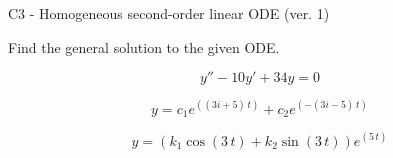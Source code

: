 \begin{exercise}
  \begin{exerciseTitle}C3 - Homogeneous second-order linear ODE (ver. 1)\end{exerciseTitle}
  \begin{exerciseStatement}
    
Find the general solution to the given ODE.

    
\[y''-10y'+34y = 0\]

  \end{exerciseStatement}
  \begin{exerciseAnswer}
    
\[y= c_{1} e^{\left(\left(3 i + 5\right) \, t\right)} + c_{2} e^{\left(-\left(3 i - 5\right) \, t\right)}\]

    
\[y= {\left(k_{1} \cos\left(3 \, t\right) + k_{2} \sin\left(3 \, t\right)\right)} e^{\left(5 \, t\right)}\]

  \end{exerciseAnswer}
\end{exercise}
